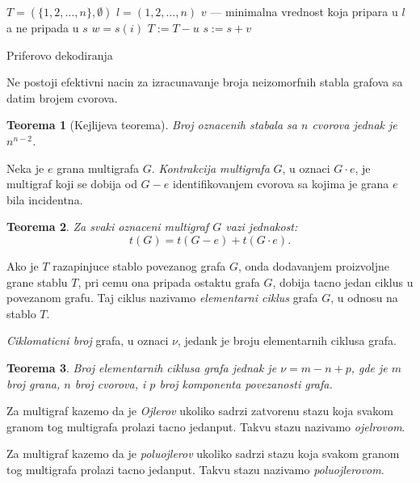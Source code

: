 \documentclass[12p, a4paper]{article}
\newtheorem*{theorem}{Teorema}
\begin{document}
\begin{multicols}{2}
    \begin{algorithm}[H]
        $T = (\{1, 2, \ldots, n\}, \emptyset)$\;
        $l = (1, 2, \ldots, n)$\;
        {$v$ --- minimalna vrednost koja pripara u $l$ a ne pripada u $s$\;
        $w = s(i)$\;
        $T:= T - u$\;
        $s:= s + v$\;}
        \caption{Priferovo dekodiranja}
    \end{algorithm}

    Ne postoji efektivni nacin za izracunavanje broja neizomorfnih stabla 
    grafova sa datim brojem cvorova.

    \begin{theorem}[Kejlijeva teorema]
        Broj oznacenih stabala sa $n$ cvorova jednak je $n^{n-2}$.
    \end{theorem}

    Neka je $e$ grana multigrafa $G$. \emph{Kontrakcija multigrafa} $G$, u 
    oznaci $G \cdot e$, je multigraf koji se dobija od $G - e$ identifikovanjem
    cvorova sa kojima je grana $e$ bila incidentna.

    \begin{theorem}
        Za svaki oznaceni multigraf $G$ vazi jednakost:
        \[
            t(G) = t(G-e) + t(G \cdot e).
        \]
    \end{theorem}

    Ako je $T$ razapinjuce stablo povezanog grafa $G$, onda dodavanjem
    proizvoljne grane stablu $T$, pri cemu ona pripada ostaktu grafa $G$, 
    dobija tacno jedan ciklus u povezanom grafu. Taj ciklus nazivamo
    \emph{elementarni ciklus} grafa $G$, u odnosu na stablo $T$.

    \emph{Ciklomaticni broj} grafa, u oznaci $\nu$, jedank je broju 
    elementarnih ciklusa grafa.
    
    \begin{theorem}
        Broj elementarnih ciklusa grafa jednak je $\nu = m - n + p$, gde
        je $m$ broj grana, $n$ broj cvorova, i $p$ broj komponenta povezanosti
        grafa.
    \end{theorem}

    Za multigraf kazemo da je \emph{Ojlerov} ukoliko sadrzi zatvorenu stazu 
    koja svakom granom tog multigrafa prolazi tacno jedanput. Takvu stazu
    nazivamo \emph{ojelrovom}.

    Za multigraf kazemo da je \emph{poluojlerov} ukoliko sadrzi stazu 
    koja svakom granom tog multigrafa prolazi tacno jedanput. Takvu stazu
    nazivamo \emph{poluojlerovom}.


\end{multicols}
\end{document}
